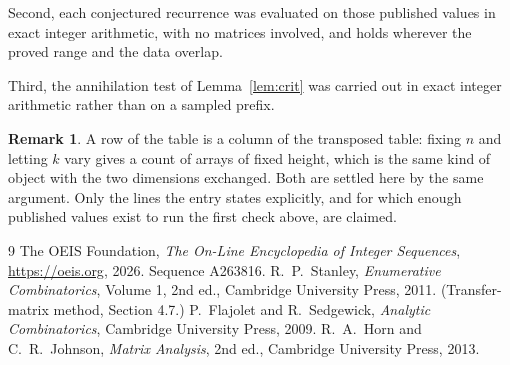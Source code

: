 \documentclass[11pt,a4paper]{article}
\theoremstyle{plain}
\theoremstyle{definition}
\newtheorem{remark}[theorem]{Remark}
\begin{document}
Second, each conjectured recurrence was evaluated on those published values in exact
integer arithmetic, with no matrices involved, and holds wherever the proved range and the
data overlap.

Third, the annihilation test of Lemma~\ref{lem:crit} was carried out in exact integer
arithmetic rather than on a sampled prefix.

\begin{remark}
A row of the table is a column of the transposed table: fixing $n$ and letting $k$ vary gives a
count of arrays of fixed height, which is the same kind of object with the two dimensions
exchanged. Both are settled here by the same argument. Only the lines the entry states
explicitly, and for which enough published values exist to run the first check above, are
claimed.
\end{remark}

\begin{thebibliography}{9}
 The OEIS Foundation, \emph{The On-Line Encyclopedia of Integer
Sequences}, \url{https://oeis.org}, 2026. Sequence A263816.
 R.~P.~Stanley, \emph{Enumerative Combinatorics}, Volume 1, 2nd ed.,
Cambridge University Press, 2011. (Transfer-matrix method, Section 4.7.)
 P.~Flajolet and R.~Sedgewick, \emph{Analytic Combinatorics}, Cambridge
University Press, 2009.
 R.~A.~Horn and C.~R.~Johnson, \emph{Matrix Analysis}, 2nd ed., Cambridge
University Press, 2013.
\end{thebibliography}
\end{document}
